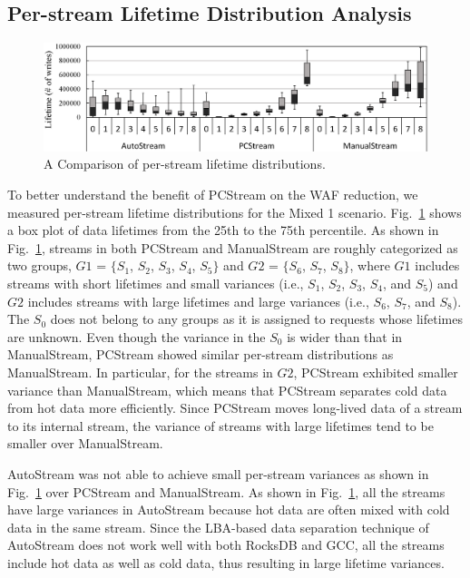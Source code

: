 \subsection{Per-stream Lifetime Distribution Analysis}

\begin{figure}[t]
	\centering
	\includegraphics[width=1\linewidth]{figure/distribution}
	\caption{A Comparison of per-stream lifetime distributions.}
	\label{fig:distribution}
	\vspace{-10pt}
\end{figure}

To better understand the benefit of \textsf{\small PCStream} on the WAF reduction,
we measured per-stream lifetime distributions for the Mixed 1
scenario.  Fig.~\ref{fig:distribution} shows a box plot of data lifetimes from
the 25th to the 75th percentile.  As shown in Fig.~\ref{fig:distribution},
streams in both \textsf{\small PCStream} and \textsf{\small ManualStream} 
are roughly categorized as
two groups, $G1$ = $\{S_1$, $S_2$, $S_3$, $S_4$, $S_5\}$ and 
$G2$ = $\{S_6$, $S_7$, $S_8\}$, where $G1$
includes streams with short lifetimes and small variances 
(i.e., $S_1$, $S_2$, $S_3$, $S_4$, and $S_5$) and 
$G2$ includes streams with large lifetimes and large variances
(i.e., $S_6$, $S_7$, and $S_8$). The $S_0$ does not belong to any groups as it
is assigned to requests whose lifetimes are unknown.  Even though the variance
in the $S_0$ is wider than that in \textsf{\small ManualStream}, 
\textsf{\small PCStream} showed similar
per-stream distributions as \textsf{\small ManualStream}. 
In particular, for the streams in $G2$,
\textsf{\small PCStream} exhibited smaller variance than \textsf{\small ManualStream}, 
which means that \textsf{\small PCStream}
separates cold data from hot data more efficiently.  
Since \textsf{\small PCStream} moves long-lived data of a stream to its internal stream, 
the variance of streams with large lifetimes tend to be smaller over \textsf{\small ManualStream}.

\textsf{\small AutoStream} was not able to achieve small
per-stream variances as shown in Fig.~\ref{fig:distribution}
over \textsf{\small PCStream} and \textsf{\small ManualStream}. 
As shown in Fig.~\ref{fig:distribution}, all the streams have large variances in 
\textsf{\small AutoStream} because hot data are often mixed with cold data in the same stream.  
Since the LBA-based data separation technique of \textsf{\small AutoStream}
does not work well with both RocksDB and GCC, 
all the streams include hot data as well as cold data, thus resulting in large lifetime variances. 

